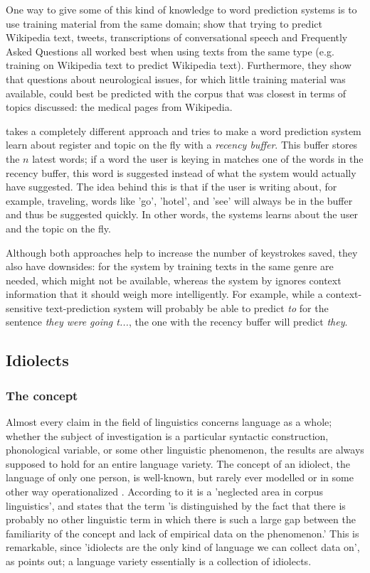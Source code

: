 \documentclass[11pt]{article}
\begin{document}
One way to give some of this kind of knowledge to word prediction systems is to use training material from the same domain;  show that trying to predict Wikipedia text, tweets, transcriptions of conversational speech and Frequently Asked Questions all worked best when using texts from the same type (e.g. training on Wikipedia text to predict Wikipedia text). Furthermore, they show that questions about neurological issues, for which little training material was available, could best be predicted with the corpus that was closest in terms of topics discussed: the medical pages from Wikipedia. 

 takes a completely different approach and tries to make a word prediction system learn about register and topic on the fly with a \emph{recency buffer}. This buffer stores the $n$ latest words; if a word the user is keying in matches one of the words in the recency buffer, this word is suggested instead of what the system would actually have suggested. The idea behind this is that if the user is writing about, for example, traveling, words like 'go', 'hotel', and 'see' will always be in the buffer and thus be suggested quickly. In other words, the systems learns about the user and the topic on the fly.

Although both approaches help to increase the number of keystrokes saved, they also have downsides: for the system by  training texts in the same genre are needed, which might not be available, whereas the system by  ignores context information that it should weigh more intelligently. For example, while a context-sensitive text-prediction system will probably be able to predict \emph{to} for the sentence \emph{they were going t...}, the one with the recency buffer will predict \emph{they}.


\subsection{Idiolects} \label{idiolects}

\subsubsection{The concept}
Almost every claim in the field of linguistics concerns language as a whole; whether the subject of investigation is a particular syntactic construction, phonological variable, or some other linguistic phenomenon, the results are always supposed to hold for an entire language variety. The concept of an idiolect, the language of only one person, is well-known, but rarely ever modelled or in some other way operationalized \cite{mollin09, barlow10, louwerse04}. According to  it is a 'neglected area in corpus linguistics', and  states that the term 'is distinguished by the fact that there is probably no other linguistic term in which there is such a large gap between the familiarity of the concept and lack of empirical data on the phenomenon.' This is remarkable, since 'idiolects are the only kind of language we can collect data on', as  points out; a language variety essentially is a collection of idiolects.
\end{document}
